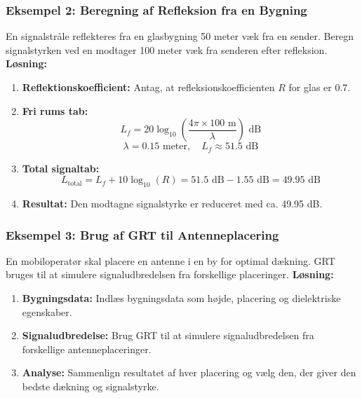 \documentclass[a4paper,12pt]{book}
\begin{document}
	\subsubsection{Eksempel 2: Beregning af Refleksion fra en Bygning}
	\noindent En signalstråle reflekteres fra en glasbygning 50 meter væk fra en sender. Beregn signalstyrken ved en modtager 100 meter væk fra senderen efter refleksion.
	\newline\newline
	\noindent \textbf{Løsning:}
	\begin{enumerate}
		\item \textbf{Reflektionskoefficient:} Antag, at refleksionskoefficienten \( R \) for glas er 0.7.
		\item \textbf{Fri rums tab:}
		\[
		L_f = 20 \log_{10}\left(\frac{4\pi \times 100 \text{ m}}{\lambda}\right) \text{ dB}
		\]
		\[
		\lambda = 0.15 \text{ meter}, \quad L_f \approx 51.5 \text{ dB}
		\]
		\item \textbf{Total signaltab:}
		\[
		L_{\text{total}} = L_f + 10 \log_{10}(R) = 51.5 \text{ dB} - 1.55 \text{ dB} = 49.95 \text{ dB}
		\]
		\item \textbf{Resultat:} Den modtagne signalstyrke er reduceret med ca. 49.95 dB.
	\end{enumerate}
	
	\subsubsection{Eksempel 3: Brug af GRT til Antenneplacering}
	\noindent En mobiloperatør skal placere en antenne i en by for optimal dækning. GRT bruges til at simulere signaludbredelsen fra forskellige placeringer.
	\newline\newline
	\noindent \textbf{Løsning:}
	\begin{enumerate}
		\item \textbf{Bygningsdata:} Indlæs bygningsdata som højde, placering og dielektriske egenskaber.
		\item \textbf{Signaludbredelse:} Brug GRT til at simulere signaludbredelsen fra forskellige antenneplaceringer.
		\item \textbf{Analyse:} Sammenlign resultatet af hver placering og vælg den, der giver den bedste dækning og signalstyrke.
	\end{enumerate}
\end{document}
